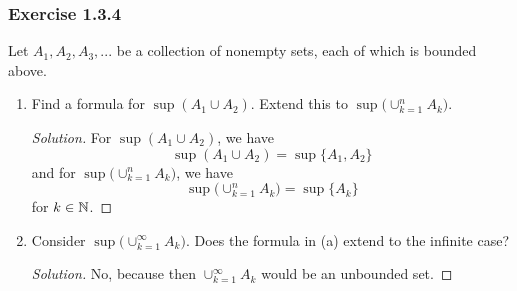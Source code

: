 \subsubsection{Exercise 1.3.4}
Let \( A_1, A_2, A_3,... \) be a collection of nonempty sets, each of which is bounded above. 

\begin{enumerate}
    \item Find a formula for \( \sup (A_1 \cup A_2 )\). Extend this to \( \sup \big( \cup_{k=1 }^{n} A_k \big)\). 
    \begin{proof}[Solution]
        For \( \sup (A_1 \cup A_2 )\), we have \[ \sup (A_1 \cup A_2 ) = \sup\{ A_1, A_2 \}\] and for  
        \( \sup \big( \cup_{k=1 }^{n} A_k \big)\), we have 
        \[ \sup \big( \cup_{k=1 }^{n} A_k\big) = \sup\{ A_k \} \]
        for \( k \in \mathbb{N} \). 
    \end{proof}
    \item Consider \( \sup \big( \cup_{k=1 }^{\infty} A_k\big) \). Does the formula in (a)  extend to the infinite case? 
    \begin{proof}[Solution]
        No, because then \( \cup_{k=1 }^{\infty} A_k  \) would be an unbounded set. 
    \end{proof}
\end{enumerate}



